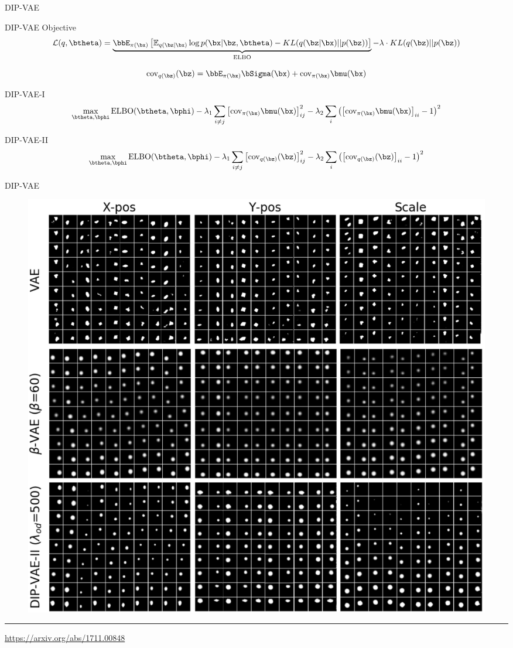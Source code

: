 \begin{frame}{DIP-VAE}
	\begin{block}{DIP-VAE Objective}
		\vspace{-0.3cm}
		{\footnotesize
			\[
			\mathcal{L}(q, \btheta) = \underbrace{\bbE_{\pi(\bx)} \left[ \mathbb{E}_{q(\bz | \bx)} \log p(\bx | \bz, \btheta) - KL(q(\bz | \bx) || p(\bz)) \right]}_{\text{ELBO}} -\lambda \cdot KL(q(\bz) || p(\bz))
			\]
		}
		\vspace{-0.5cm}
	\end{block}
	\[
		\text{cov}_{q(\bz)}(\bz) = \bbE_{\pi(\bx)} \bSigma(\bx) + \text{cov}_{\pi(\bx)} \bmu(\bx)
	\]
	\vspace{-0.3cm}
	\begin{block}{DIP-VAE-I}
		\vspace{-0.3cm}
		\[
			\max_{\btheta, \bphi} \text{ELBO}(\btheta, \bphi) - \lambda_1 \sum_{i \neq j} \left[\text{cov}_{\pi(\bx)} \bmu(\bx)\right]^2_{ij} - \lambda_2 \sum_{i} \left( \left[ \text{cov}_{\pi(\bx)} \bmu(\bx) \right]_{ii} - 1 \right)^2
		\]
		\vspace{-0.3cm}
	\end{block}
	\begin{block}{DIP-VAE-II}
		\vspace{-0.3cm}
		\[
			\max_{\btheta, \bphi} \text{ELBO}(\btheta, \bphi) - \lambda_1 \sum_{i \neq j} \left[\text{cov}_{q(\bz)} (\bz) \right]^2_{ij} - \lambda_2 \sum_{i} \left( \left[ \text{cov}_{q(\bz)} (\bz) \right]_{ii} - 1 \right)^2
		\]
		\vspace{-0.3cm}
	\end{block}

\end{frame}
\begin{frame}{DIP-VAE}
	\begin{figure}
		\centering
		\includegraphics[width=0.8\linewidth]{figs/dip-vae_1}
	\end{figure}
	\vfill
	\hrule\medskip
	{\scriptsize \href{https://arxiv.org/abs/1711.00848}{https://arxiv.org/abs/1711.00848}}
\end{frame}
